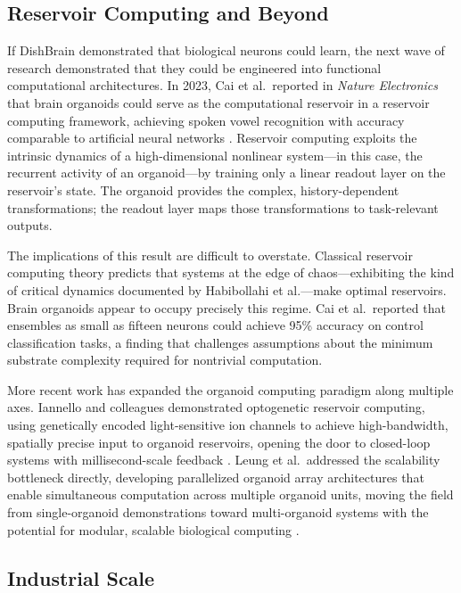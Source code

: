 \subsection{Reservoir Computing and Beyond}

If DishBrain demonstrated that biological neurons could learn, the next wave of research demonstrated that they could be engineered into functional computational architectures. In 2023, Cai et al.\ reported in \emph{Nature Electronics} that brain organoids could serve as the computational reservoir in a reservoir computing framework, achieving spoken vowel recognition with accuracy comparable to artificial neural networks \cite{cai2023reservoir}. Reservoir computing exploits the intrinsic dynamics of a high-dimensional nonlinear system---in this case, the recurrent activity of an organoid---by training only a linear readout layer on the reservoir's state. The organoid provides the complex, history-dependent transformations; the readout layer maps those transformations to task-relevant outputs.

The implications of this result are difficult to overstate. Classical reservoir computing theory predicts that systems at the edge of chaos---exhibiting the kind of critical dynamics documented by Habibollahi et al.---make optimal reservoirs. Brain organoids appear to occupy precisely this regime. Cai et al.\ reported that ensembles as small as fifteen neurons could achieve 95\% accuracy on control classification tasks, a finding that challenges assumptions about the minimum substrate complexity required for nontrivial computation.

More recent work has expanded the organoid computing paradigm along multiple axes. Iannello and colleagues demonstrated optogenetic reservoir computing, using genetically encoded light-sensitive ion channels to achieve high-bandwidth, spatially precise input to organoid reservoirs, opening the door to closed-loop systems with millisecond-scale feedback \cite{iannello2025optogenetic}. Leung et al.\ addressed the scalability bottleneck directly, developing parallelized organoid array architectures that enable simultaneous computation across multiple organoid units, moving the field from single-organoid demonstrations toward multi-organoid systems with the potential for modular, scalable biological computing \cite{leung2025array}.

\subsection{Industrial Scale}

